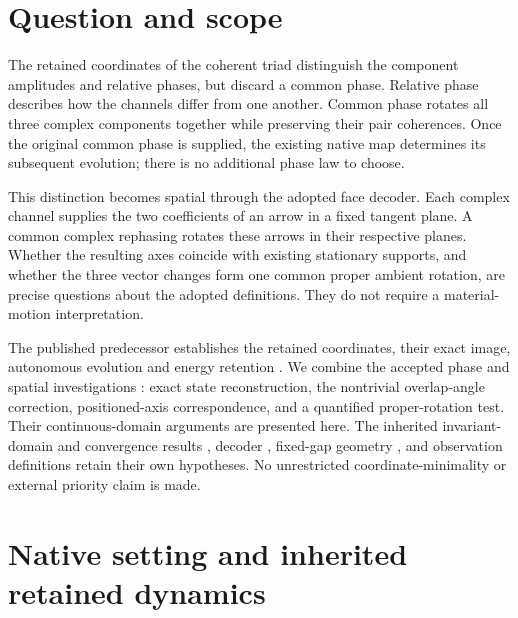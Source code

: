 \section{Question and scope}\label{sec:introduction}

The retained coordinates of the coherent triad distinguish the component amplitudes and relative phases, but discard a common phase. Relative phase describes how the channels differ from one another. Common phase rotates all three complex components together while preserving their pair coherences. Once the original common phase is supplied, the existing native map determines its subsequent evolution; there is no additional phase law to choose.

This distinction becomes spatial through the adopted face decoder. Each complex channel supplies the two coefficients of an arrow in a fixed tangent plane. A common complex rephasing rotates these arrows in their respective planes. Whether the resulting axes coincide with existing stationary supports, and whether the three vector changes form one common proper ambient rotation, are precise questions about the adopted definitions. They do not require a material-motion interpretation.

The published predecessor establishes the retained coordinates, their exact image, autonomous evolution and energy retention \cite{potential}. We combine the accepted phase and spatial investigations \cite{phase,spatial}: exact state reconstruction, the nontrivial overlap-angle correction, positioned-axis correspondence, and a quantified proper-rotation test. Their continuous-domain arguments are presented here. The inherited invariant-domain and convergence results \cite{relaxation}, decoder \cite{nrg}, fixed-gap geometry \cite{fixedgap}, and observation definitions \cite{zmethods} retain their own hypotheses. No unrestricted coordinate-minimality or external priority claim is made.

\section{Native setting and inherited retained dynamics}\label{sec:setting}

